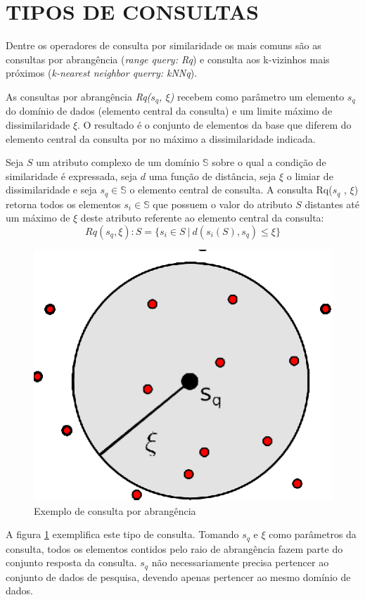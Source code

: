 \section{TIPOS DE CONSULTAS}
\label{sec:tiposconsultas}

Dentre os operadores de consulta por similaridade os mais comuns são as consultas por abrangência (\textit{range query: Rq}) e consulta aos k-vizinhos mais próximos (\textit{k-nearest neighbor querry: kNNq}).\par 

As consultas por abrangência \textit{Rq($s_q$, $\xi$)} recebem como parâmetro um elemento $s_q$ do domínio de dados (elemento central da consulta) e um limite máximo de dissimilaridade $\xi$. O resultado é o conjunto de 
elementos da base que diferem do elemento central da consulta por no máximo a dissimilaridade indicada.\par
\begin{mydef}
 \label{def:def_rq}
  Seja $S$ um atributo complexo de um domínio $\mathbb{S}$ sobre o qual a condição de similaridade é expressada, seja $d$ uma
  função de distância, seja $\xi$ o limiar de dissimilaridade e seja $s_q \in \mathbb{S}$ o elemento central de consulta. 
  A consulta Rq($s_q$ , $\xi$) retorna todos os elementos $s_i \in \mathbb{S}$ que possuem o valor do atributo $S$ distantes
  até um máximo de $\xi$ deste atributo referente ao elemento central da consulta: 
  \begin{equation} \label{eq:knnq}   
    Rq(s_q, \xi): S = \{s_i \in S \ |\ d(s_i(S), s_q) \leq \xi\}
  \end{equation}
\end{mydef}

\begin{figure}[H]
\centering
\includegraphics[width=.3\textwidth]{dados/figuras/rq.eps}
\caption{Exemplo de consulta por abrangência}
\label{fig:exemplorq}
\end{figure}

A figura \ref{fig:exemplorq} exemplifica este tipo de consulta. Tomando $s_q$ e $\xi$ como parâmetros da consulta, todos os
elementos contidos pelo raio de abrangência fazem parte do conjunto resposta da consulta. $s_q$ não necessariamente precisa
pertencer ao conjunto de dados de pesquisa, devendo apenas pertencer ao mesmo domínio de dados.


